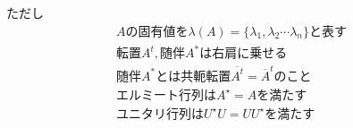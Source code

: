 \documentclass[10pt,a4paper]{ltjsarticle}
\begin{document}


ただし
\begin{gather}%
    Aの固有値を\lambda(A) = \{\lambda_1,\lambda_2 \cdots \lambda_n\} と表す\\
    転置A^t,随伴 A^{\ast}は右肩に乗せる\\
    随伴A^{\ast}とは共軛転置\overline{A^t}=\overline{A}^tのこと\\
    エルミート行列 は A^{\star}=A           を満たす\\
    ユニタリ行列   は U^{\star}U=UU^{\star} を満たす\\
\end{gather}
\end{document}
